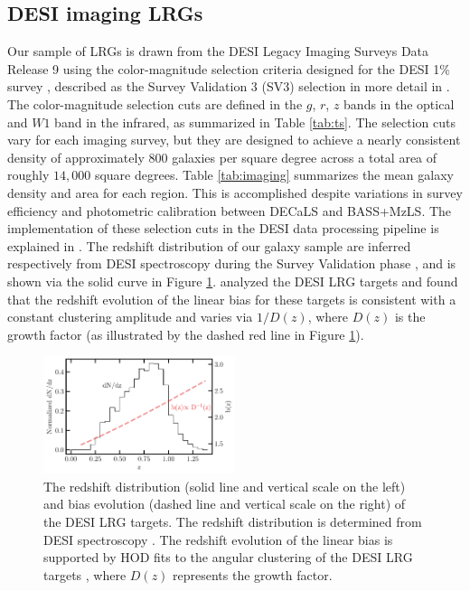 \subsection{DESI imaging LRGs}
Our sample of LRGs is drawn from the DESI Legacy Imaging Surveys Data Release 9 \citep[DR9;][]{dey2018overview} using the color-magnitude selection criteria designed for the DESI 1\% survey \citep{desi2023sv}, described as the Survey Validation 3 (SV3) selection in more detail in \cite{zhou2022target}. The color-magnitude selection cuts are defined in the $g$, $r$, $z$ bands in the optical and $W1$ band in the infrared, as summarized in Table \ref{tab:ts}. The selection cuts vary for each imaging survey, but they are designed to achieve a nearly consistent density of approximately $800$ galaxies per square degree across a total area of roughly $14,000$ square degrees. Table \ref{tab:imaging} summarizes the mean galaxy density and area for each region. This is accomplished despite variations in survey efficiency and photometric calibration between DECaLS and BASS+MzLS. The implementation of these selection cuts in the DESI data processing pipeline is explained in \cite{myers2022}. The redshift distribution of our galaxy sample are inferred respectively from DESI spectroscopy during the Survey Validation phase \citep{desi2023sv}, and is shown via the solid curve in Figure \ref{fig:nz}. \cite{zhou2021clustering} analyzed the DESI LRG targets and found that the redshift evolution of the linear bias for these targets is consistent with a constant clustering amplitude and varies via $1/D(z)$, where $D(z)$ is the growth factor (as illustrated by the dashed red line in Figure \ref{fig:nz}). 

\begin{figure}
 \centering
 \includegraphics[width=0.5\textwidth]{figures/nz_lrg.pdf}
 \caption{The redshift distribution (solid line and vertical scale on the left) and bias evolution (dashed line and vertical scale on the right) of the DESI LRG targets. The redshift distribution is determined from DESI spectroscopy \citep{desi2023sv}. The redshift evolution of the linear bias is supported by HOD fits to the angular clustering of the DESI LRG targets \citep{zhou2021clustering}, where $D(z)$ represents the growth factor.}
 \label{fig:nz}
\end{figure}

